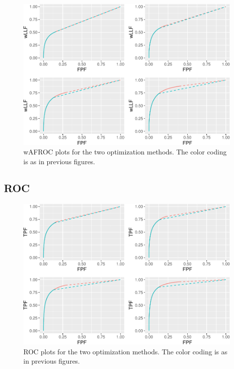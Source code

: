 \documentclass[
]{book}
\begin{document}
\begin{figure}
\centering
\includegraphics{22-optim-op-point_files/figure-latex/optim-op-point-vary-nu-wafroc-1.pdf}
\caption{\label{fig:optim-op-point-vary-nu-wafroc}wAFROC plots for the two optimization methods. The color coding is as in previous figures.}
\end{figure}

\hypertarget{roc-3}{%
\subsection{ROC}\label{roc-3}}

\begin{figure}
\centering
\includegraphics{22-optim-op-point_files/figure-latex/optim-op-point-vary-nu-roc-1.pdf}
\caption{\label{fig:optim-op-point-vary-nu-roc}ROC plots for the two optimization methods. The color coding is as in previous figures.}
\end{figure}
\end{document}
